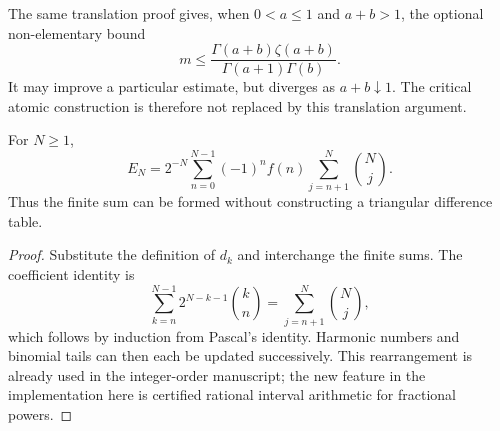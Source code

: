 The same translation proof gives, when $0<a\le1$ and $a+b>1$,
the optional non-elementary bound
\[
 m\le\frac{\Gamma(a+b)\zeta(a+b)}{\Gamma(a+1)\Gamma(b)}.
\]
It may improve a particular estimate, but diverges as $a+b\downarrow1$.
The critical atomic construction is therefore not replaced by this
translation argument.

\begin{proposition}\label{rw:prop:weights}
For $N\ge1$,
\begin{equation}\label{rw:eq:weights}
 E_N=2^{-N}\sum_{n=0}^{N-1}(-1)^nf(n)
                  \sum_{j=n+1}^N\binom Nj.
\end{equation}
Thus the finite sum can be formed without constructing a triangular
difference table.
\end{proposition}
\begin{proof}
Substitute the definition of $d_k$ and interchange the finite sums.
The coefficient identity is
\[
 \sum_{k=n}^{N-1}2^{N-k-1}\binom kn=\sum_{j=n+1}^N\binom Nj,
\]
which follows by induction from Pascal's identity. Harmonic numbers
and binomial tails can then each be updated successively. This
rearrangement is already used in the integer-order manuscript; the
new feature in the implementation here is certified rational
interval arithmetic for fractional powers.
\end{proof}

